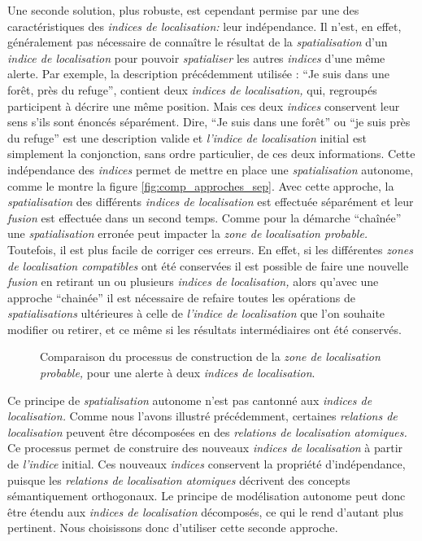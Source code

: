 Une seconde solution, plus robuste, est cependant permise par une des
caractéristiques des \emph{indices de localisation:} leur
indépendance. Il n'est, en effet, généralement pas nécessaire de
connaître le résultat de la \emph{spatialisation} d'un \emph{indice de
  localisation} pour pouvoir \emph{spatialiser} les autres
\emph{indices} d'une même alerte. Par exemple, la description
précédemment utilisée : \enquote{Je suis dans une forêt, près du
  refuge}, contient deux \emph{indices de localisation,} qui,
regroupés participent à décrire une même position. Mais ces deux
\emph{indices} conservent leur sens s'ils sont énoncés
séparément. Dire, \enquote{Je suis dans une forêt} ou \enquote{je suis
  près du refuge} est une description valide et \emph{l'indice de
  localisation} initial est simplement la conjonction, sans ordre
particulier, de ces deux informations. Cette indépendance des
\emph{indices} permet de mettre en place une \emph{spatialisation}
autonome, comme le montre la figure \ref{fig:comp_approches_sep}. Avec
cette approche, la \emph{spatialisation} des différents \emph{indices
  de localisation} est effectuée séparément et leur \emph{fusion} est
effectuée dans un second temps. Comme pour la démarche
\enquote{chaînée} une \emph{spatialisation} erronée peut impacter la
\emph{zone de localisation probable.} Toutefois, il est plus facile de
corriger ces erreurs. En effet, si les différentes \emph{zones de
  localisation compatibles} ont été conservées il est possible de
faire une nouvelle \emph{fusion} en retirant un ou plusieurs
\emph{indices de localisation,} alors qu'avec une approche
\enquote{chainée} il est nécessaire de refaire toutes les opérations
de \emph{spatialisations} ultérieures à celle de \emph{l'indice de
  localisation} que l'on souhaite modifier ou retirer, et ce même si
les résultats intermédiaires ont été conservés.

\begin{figure}
  \centering

  \caption{Comparaison du processus de construction de la \emph{zone
      de localisation probable,} pour une alerte à deux \emph{indices
      de localisation}.}
  \label{fig:comp_approches}
\end{figure}

Ce principe de \emph{spatialisation} autonome n'est pas cantonné aux
\emph{indices de localisation.} Comme nous l'avons illustré
précédemment, certaines \emph{relations de localisation} peuvent être
décomposées en des \emph{relations de localisation atomiques.} Ce
processus permet de construire des nouveaux \emph{indices de
  localisation} à partir de \emph{l'indice} initial. Ces nouveaux
\emph{indices} conservent la propriété d'indépendance, puisque les
\emph{relations de localisation atomiques} décrivent des concepts
sémantiquement orthogonaux. Le principe de modélisation autonome peut
donc être étendu aux \emph{indices de localisation} décomposés, ce qui
le rend d'autant plus pertinent. Nous choisissons donc d'utiliser
cette seconde approche.

